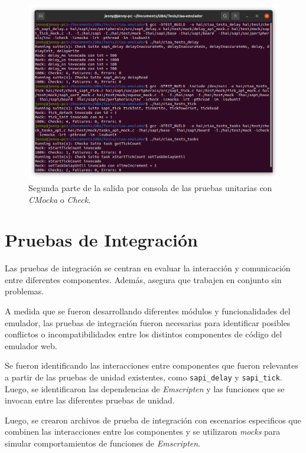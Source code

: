 \begin{figure}[ht]
	\centering
	\includegraphics[scale=.27]{./Figures/PruebasUnidad2.png}
	\caption{Segunda parte de la salida por consola de las pruebas unitarias con \textit{CMocka} o \textit{Check}.}
	\label{fig:PruebasUnidad2}
\end{figure}
 

\section{Pruebas de Integración} 
\label{subsec:Pruebas de Integración}

Las pruebas de integración se centran en evaluar la interacción y comunicación entre diferentes componentes. Además, asegura que trabajen en conjunto sin problemas.

A medida que se fueron desarrollando diferentes módulos y funcionalidades del emulador, las pruebas de integración fueron necesarias para identificar posibles conflictos o incompatibilidades entre los distintos componentes de código del emulador web.

Se fueron identificando las interacciones entre componentes que fueron relevantes a partir de las pruebas de unidad existentes, como \texttt{sapi\_delay} y \texttt{sapi\_tick}. Luego, se identificaron las dependencias de \textit{Emscripten} y las funciones que se invocan entre las diferentes pruebas de unidad.

Luego, se crearon archivos de prueba de integración con escenarios especificos que combinen las interacciones entre los componentes y se utilizaron \textit{mocks} para simular comportamientos de funciones de \textit{Emscripten}.

